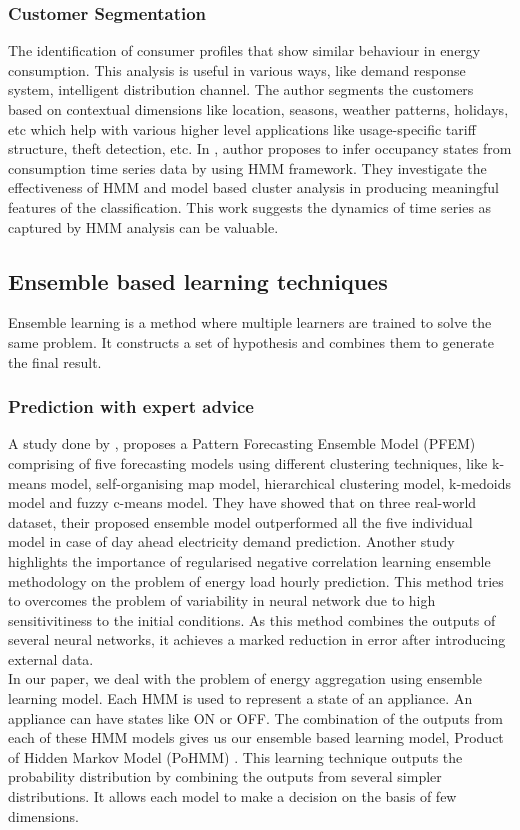 \documentclass{sig-alternate}
\begin{document}
\subsubsection{Customer Segmentation}
The identification of consumer profiles that show similar behaviour in energy consumption. This analysis is useful in various ways, like demand response system, intelligent distribution channel. The author \cite{wijaya2014consumer} segments the customers based on contextual dimensions like location, seasons, weather patterns, holidays, etc which help with various higher level applications like usage-specific tariff structure, theft detection, etc. In \cite{Albert}, author proposes to infer occupancy states from consumption time series data by using HMM framework. They investigate the effectiveness of HMM and model based cluster analysis in producing meaningful features of the classification. This work suggests the dynamics of time series as captured by HMM analysis can be valuable.

\subsection{Ensemble based learning techniques}
Ensemble learning is a method where multiple learners are trained to solve the same problem. It constructs a set of hypothesis and combines them to generate the final result.
\subsubsection{Prediction with expert advice}
A study done by \cite{Shen}, proposes a Pattern Forecasting Ensemble Model (PFEM) comprising of five forecasting models using different clustering techniques, like k-means model, self-organising map model, hierarchical clustering model, k-medoids model and fuzzy c-means model. They have showed that on three real-world dataset, their proposed ensemble model outperformed all the five individual model in case of day ahead electricity demand prediction.
Another study \cite{Felice} highlights the importance of regularised negative correlation learning ensemble methodology on the problem of energy load hourly prediction. This method tries to overcomes the problem of variability in neural network due to high sensitivitiness to the initial conditions. As this method combines the outputs of several neural networks, it achieves a marked reduction in error after introducing external data. \\
In our paper,  we deal with the problem of energy aggregation using ensemble learning model. Each HMM is used to represent a state of an appliance. An appliance can have states like ON or OFF. The combination of the outputs from each of these HMM models gives us our ensemble based learning model, Product of Hidden Markov Model (PoHMM) \cite{hinton2000}. This learning technique outputs the probability distribution by combining the outputs from several simpler distributions. It allows each model to make a decision on the basis of few dimensions.
\end{document}

